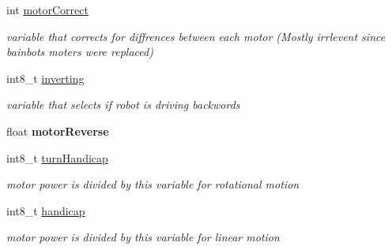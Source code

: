 \begin{DoxyCompactItemize}
\item 
\mbox{\label{class_omni_drive_conrtoller_a0a78c1214005e227761e651657e66200}} 
int \mbox{\hyperlink{class_omni_drive_conrtoller_a0a78c1214005e227761e651657e66200}{motor\+Correct}}
\begin{DoxyCompactList}\small\item\em variable that corrects for diffrences between each motor (Mostly irrlevent since bainbots moters were replaced) \end{DoxyCompactList}\item 
\mbox{\label{class_omni_drive_conrtoller_af911b890cd2e146b211c0e7c4b53fc86}} 
int8\+\_\+t \mbox{\hyperlink{class_omni_drive_conrtoller_af911b890cd2e146b211c0e7c4b53fc86}{inverting}}
\begin{DoxyCompactList}\small\item\em variable that selects if robot is driving backwords \end{DoxyCompactList}\item 
\mbox{\label{class_omni_drive_conrtoller_a03baba5698664886fece7c2bc1acd81b}} 
float {\bfseries motor\+Reverse}
\item 
\mbox{\label{class_omni_drive_conrtoller_a80e1f3c07bae70a77ecd2444ee589ca0}} 
int8\+\_\+t \mbox{\hyperlink{class_omni_drive_conrtoller_a80e1f3c07bae70a77ecd2444ee589ca0}{turn\+Handicap}}
\begin{DoxyCompactList}\small\item\em motor power is divided by this variable for rotational motion \end{DoxyCompactList}\item 
\mbox{\label{class_omni_drive_conrtoller_af9a59405abbb827a1ab9934561c0004d}} 
int8\+\_\+t \mbox{\hyperlink{class_omni_drive_conrtoller_af9a59405abbb827a1ab9934561c0004d}{handicap}}
\begin{DoxyCompactList}\small\item\em motor power is divided by this variable for linear motion \end{DoxyCompactList}\item 
\mbox{\label{class_omni_drive_conrtoller_a8386f67e9931ac191335c14c4b56bbda}} 

\end{DoxyCompactItemize}
